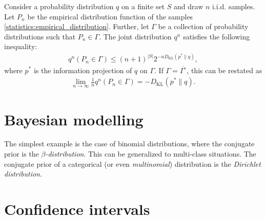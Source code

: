 {    \begin{theorem}[Sanov]
        Consider a probability distribution $q$ on a finite set $S$ and draw $n$ i.i.d. samples. Let $P_n$ be the empirical distribution function of the samples \eqref{statistics:empirical_distribution}. Further, let $\Gamma$ be a collection of probability distributions such that $P_n\in\Gamma$. The joint distribution $q^n$ satisfies the following inequality:
        \begin{gather}
            q^n(P_n\in\Gamma) \leq (n+1)^{|S|}2^{-n D_\mathrm{KL}(p^*\|q)},
        \end{gather}
        where $p^*$ is the information projection of $q$ on $\Gamma$. If $\Gamma=\overline{\Gamma^\circ}$, this can be restated as
        \begin{gather}
            \lim_{n\rightarrow\infty}\frac{1}{n}q^n(P_n\in\Gamma) = - D_\mathrm{KL}(p^*\|q).
        \end{gather}
    \end{theorem}

\section{Bayesian modelling}

    \begin{example}
        The simplest example is the case of binomial distributions, where the conjugate prior is the \textit{$\beta$-distribution}. This can be generalized to multi-class situations. The conjugate prior of a categorical (or even \textit{multinomial}) distribution is the \textit{Dirichlet distribution}.
    \end{example}

\section{Confidence intervals}\label{section:confidence}

}
